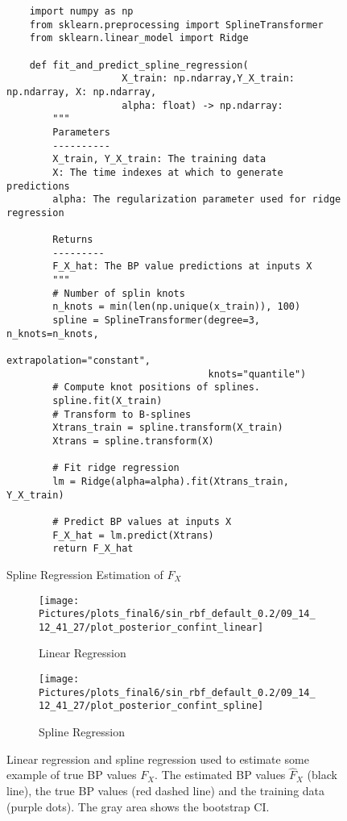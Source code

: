 %
\begin{figure}[!htb]
\centering

\begin{verbatim}
    import numpy as np
    from sklearn.preprocessing import SplineTransformer
    from sklearn.linear_model import Ridge

    def fit_and_predict_spline_regression(
                    X_train: np.ndarray,Y_X_train: np.ndarray, X: np.ndarray,
                    alpha: float) -> np.ndarray:
        """
        Parameters
        ----------
        X_train, Y_X_train: The training data
        X: The time indexes at which to generate predictions
        alpha: The regularization parameter used for ridge regression

        Returns
        ---------
        F_X_hat: The BP value predictions at inputs X
        """
        # Number of splin knots
        n_knots = min(len(np.unique(x_train)), 100)
        spline = SplineTransformer(degree=3, n_knots=n_knots,
                                   extrapolation="constant",
                                   knots="quantile")
        # Compute knot positions of splines.
        spline.fit(X_train)
        # Transform to B-splines
        Xtrans_train = spline.transform(X_train)
        Xtrans = spline.transform(X)

        # Fit ridge regression
        lm = Ridge(alpha=alpha).fit(Xtrans_train, Y_X_train)

        # Predict BP values at inputs X
        F_X_hat = lm.predict(Xtrans)
        return F_X_hat

\end{verbatim}
\caption{Spline Regression Estimation of $F_X$}
\label{code:smoothing-spline}
\end{figure}



\begin{figure}[!htb]
\centering
\begin{subfigure}{.5\textwidth}
    \centering
    \texttt{[image: 
        Pictures/plots\_final6/sin\_rbf\_default\_0.2/09\_14\_12\_41\_27/plot\_posterior\_confint\_linear]}
    \caption{Linear Regression}
    \label{fig:post-linear}
\end{subfigure}\hfill
\begin{subfigure}{.5\textwidth}
    \centering
    \texttt{[image: 
        Pictures/plots\_final6/sin\_rbf\_default\_0.2/09\_14\_12\_41\_27/plot\_posterior\_confint\_spline]}
    \caption{Spline Regression}
    \label{fig:post-spline}
\end{subfigure}
\caption[Linear Regression and Spline Regression Prediction Examples]{Linear regression and spline regression used
to estimate some example of true BP values $F_X$. The estimated BP values $\hat{F}_X$ (black line), the
        true BP values (red dashed line) and the training data (purple dots). The gray area shows
the bootstrap CI.}
\label{fig:regression-example}
\end{figure}


